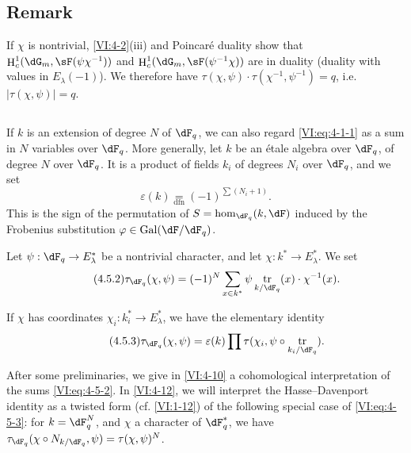 \documentclass[oneside]{book}
\DeclareMathOperator{\gal}{Gal}
\DeclareMathOperator{\h}{H}
\DeclareMathOperator{\tr}{tr}
\newcounter{char}
\theoremstyle{sga-source}
\theoremstyle{sga-source-dash}
\theoremstyle{sga-source-dotdash}
\theoremstyle{sga-source-number-note-dash}
\theoremstyle{sga-source-note-number-dotdash}
\theoremstyle{sga-source-example-dotdash}
\theoremstyle{sga-source-inline-number}
\theoremstyle{sga-source-bare-number}
\theoremstyle{sga-source}
\newcommand{\PrintPage}[1]{}\newcommand{\MathPage}[1]{}\newcommand{\PrintCite}[2]{#1}\newcommand{\var}[3]{#1}
\begin{document}
\subsection{Remark}\label{VI:4-4}

If $\chi$ is nontrivial, \ref{VI:4-2}(iii) and Poincaré duality 
show that $\h_c^1(\dG_m,\sF(\psi\chi^{-1}))$ and 
$\h_c^1(\dG_m,\sF(\psi^{-1}\chi))$ are in duality (duality with values 
in $E_\lambda(-1)$). We therefore have 
$\tau(\chi,\psi)\cdot \tau(\chi^{-1},\psi^{-1}) = q$, i.e. 
$\var{|\tau(\chi,\psi)|=q}{|\tau(\chi,\psi)|=q^{1/2}}{S45-SOL-0805}$. 





\subsection{}\label{VI:4-5}

If $k$ is an extension of degree $N$ of $\dF_q$, we can also regard 
\eqref{VI:eq:4-1-1} as a sum in $N$ variables over $\dF_q$. More 
generally, let $k$ be an étale algebra over $\dF_q$, of degree $N$ over 
$\dF_q$. It is a product of fields $k_i$ of degrees $N_i$ over $\dF_q$, and we set 
\begin{equation*}\tag{4.5.1}\label{VI:eq:4-5-1}
  \varepsilon(k) \underset{\mathrm{dfn}}{=} (-1)^{\sum (N_i+1)} \text{.} 
\end{equation*}
This is the sign of the permutation of $S=\hom_{\dF_q}(k,\dF)$ induced by the 
Frobenius substitution $\varphi\in \gal(\dF/\dF_q)$. 

Let $\psi:\dF_q\to E_\lambda^\ast$ be a nontrivial character, and let 
$\chi:k^\ast \to E_\lambda^\ast$. We set 
\begin{equation*}\tag{4.5.2}\label{VI:eq:4-5-2}
  \tau_{\dF_q}(\chi,\psi) = (-1)^N \sum_{x\in k^\ast} \psi \tr_{k/\dF_q}(x) \cdot \chi^{-1}(x) \text{.} 
\end{equation*}

If $\chi$ has coordinates $\chi_i:k_i^\ast \to E_\lambda^\ast$, we 
have the elementary identity 
\begin{equation*}\tag{4.5.3}\label{VI:eq:4-5-3}
  \tau_{\dF_q}(\chi,\psi) = \varepsilon(k) \prod \tau(\chi_i,\psi\circ \tr_{k_i/\dF_q}) \text{.}
\end{equation*}

\PrintPage{198}
After some preliminaries, we give in \ref{VI:4-10} a 
cohomological interpretation of the sums \eqref{VI:eq:4-5-2}. In 
\ref{VI:4-12}, we will interpret the Hasse--Davenport identity as a 
twisted form (cf. \ref{VI:1-12}) of the following special case of 
\eqref{VI:eq:4-5-3}: for $k=\dF_q^N$, and $\chi$ a character of 
$\dF_q^\ast$, we have 
$\tau_{\dF_q}(\chi\circ N_{k/\dF_q},\psi)=\tau(\chi,\psi)^N$. 
\end{document}
